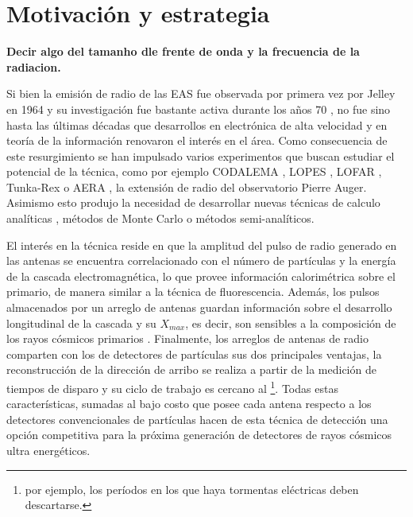 \chapter{Motivaci\'on y estrategia}
\label{ch:motRadio}

\textbf{Decir algo del tamanho dle frente de onda y la frecuencia de la radiacion.}

Si bien la emisi\'on de radio de las EAS fue observada por primera vez por Jelley en 1964 \cite{jelley1966radio} y su investigaci\'on fue bastante activa durante los a\~nos 70 \cite{allan1971progress}, no fue sino hasta las \'ultimas d\'ecadas que desarrollos en electr\'onica de alta velocidad y en teor\'ia de la informaci\'on renovaron el inter\'es en el \'area.
Como consecuencia de este resurgimiento se han impulsado varios experimentos que buscan estudiar el potencial de la t\'ecnica, como por ejemplo CODALEMA \cite{ardouin2005radio}, LOPES \cite{huege2012lopes}, LOFAR \cite{horandel2009lofar}, Tunka-Rex \cite{schroder2013tunka} o AERA \cite{kelley2011aera}, la extensi\'on de radio del observatorio Pierre Auger.
Asimismo esto produjo la necesidad de desarrollar nuevas t\'ecnicas de calculo anal\'iticas \cite{huege2003radio,scholten2008macroscopic}, m\'etodos de Monte Carlo \cite{huege2007monte,ludwig2011reas3} o m\'etodos semi-anal\'iticos\cite{scholten2009macroscopic}.

El interés en la técnica reside en que la amplitud del pulso de radio generado en las antenas se encuentra correlacionado con el número de partículas y la energía de la cascada electromagnética, lo que provee información calorimétrica sobre el primario, de manera similar a la técnica de fluorescencia.
Adem\'as, los pulsos almacenados por un arreglo de antenas guardan información sobre el desarrollo longitudinal de la cascada y su $X_{max}$, es decir, son sensibles a la composici\'on de los rayos c\'osmicos primarios \cite{cite:hauge_rec,cite:lofar_rec}.
Finalmente, los arreglos de antenas de radio comparten con los de detectores de partículas sus dos principales ventajas, la reconstrucción de la dirección de arribo se realiza a partir de la medición de tiempos de disparo y su ciclo de trabajo es cercano al \footnote{por ejemplo, los períodos en los que haya tormentas eléctricas deben descartarse.}.
Todas estas características, sumadas al bajo costo que posee cada antena respecto a los detectores convencionales de partículas hacen de esta técnica de detección una opción competitiva para la próxima generación de detectores de rayos c\'osmicos ultra energ\'eticos.

